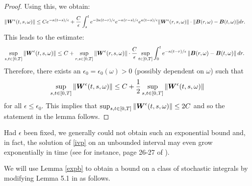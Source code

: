 \begin{proof}
Using this, we obtain:
\begin{align}
\| \boldsymbol{W}^\epsilon(t,s,\omega)\| &\leq C e^{-\kappa(t-s)/\epsilon} + \frac{C}{\epsilon} \int_s^t e^{-2 \kappa(t-r)/\epsilon} e^{-\kappa(r-s)/\epsilon} e^{\kappa(t-s)/\epsilon} \| \boldsymbol{W}^\epsilon(r,s,\omega)\| \cdot \|\boldsymbol{B}(r,\omega)-\boldsymbol{B}(t,\omega)\| dr. 
\end{align}
This leads to the estimate:
\begin{align}
\sup_{s,t \in [0,T]} \| \boldsymbol{W}^\epsilon(t,s,\omega)\| &\leq C +   \sup_{r,s \in [0,T]}\| \boldsymbol{W}^\epsilon(r,s,\omega)\|  \cdot \frac{C}{\epsilon} \sup_{t \in [0,T]} \int_0^t e^{- \kappa(t-r)/\epsilon}  \left\|\boldsymbol{B}(r,\omega)-\boldsymbol{B}(t,\omega)\right\| dr. 
\end{align}
Therefore, there exists an $\epsilon_0 = \epsilon_0(\omega) > 0$ (possibly dependent on $\omega$) such that  
\begin{equation}
\sup_{s,t \in [0,T]} \| \boldsymbol{W}^\epsilon(t,s,\omega)\| \leq C + \frac{1}{2} \sup_{s,t \in [0,T]} \| \boldsymbol{W}^\epsilon(t,s,\omega)\|
\end{equation}
for all $\epsilon \leq \epsilon_0$. This implies that $\sup_{s,t \in [0,T]} \| \boldsymbol{W}^\epsilon(t,s,\omega)\| \leq 2C$ and so the statement in the lemma follows.
\end{proof}


\begin{remark}
Had $\epsilon$ been fixed, we generally could not obtain such an exponential bound and, in fact, the solution of \eqref{ivp} on an unbounded interval may even grow exponentially in time (see for instance, page 26-27 of \cite{kabanov2013two}). 
\end{remark}


We will use Lemma \ref{expb} to obtain a bound on a class of stochastic integrals by modifying Lemma 5.1 in \cite{birrell2017small} as follows.

